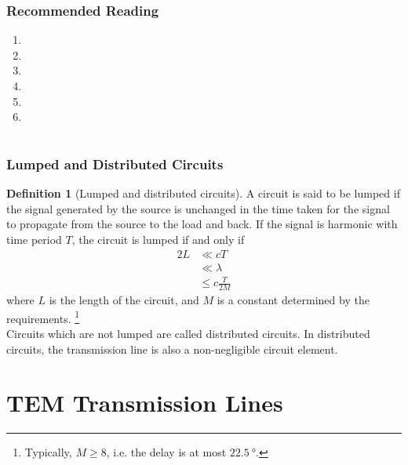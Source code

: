 \documentclass[titlepage, fleqn, a4paper, 12pt, twoside]{article}
\theoremstyle{definition}
\newtheorem{definition}{Definition}
\theoremstyle{theorem}
\begin{document}
\section{Recommended Reading}

\begin{enumerate}
	\item {}
	\item {}
	\item {}
	\item {}
	\item {}
	\item {}
\end{enumerate}

\clearpage
{}

\part{}

\section{Lumped and Distributed Circuits}

\begin{definition}[Lumped and distributed circuits]
	A circuit is said to be lumped if the signal generated by the source is unchanged in the time taken for the signal to propagate from the source to the load and back.
	If the signal is harmonic with time period $T$, the circuit is lumped if and only if
	\begin{align*}
		2 L &\ll c T\\
		&\ll \lambda\\
		&\le c \frac{T}{2 M}
	\end{align*}
	where $L$ is the length of the circuit, and $M$ is a constant determined by the requirements.
	\footnote{Typically, $M \ge 8$, i.e. the delay is at most $\SI{22.5}{\degree}$.}\\
	Circuits which are not lumped are called distributed circuits.
	In distributed circuits, the transmission line is also a non-negligible circuit element.
\end{definition}

\clearpage
\part{TEM Transmission Lines}
\end{document}
